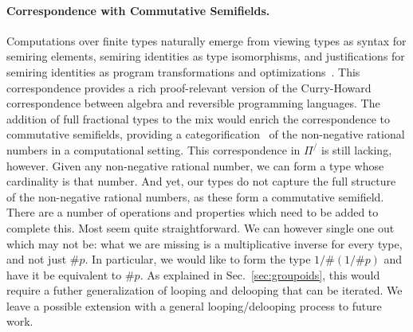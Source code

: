 \documentclass[a4paper,USenglish]{lipics-v2016-utf8x}
\newcommand{\hash}{\#}
\newcommand{\order}[1]{\hash #1}
\newcommand{\iorder}[1]{1/\hash #1}
\begin{document}
\paragraph*{Correspondence with Commutative Semifields.} Computations over
finite types naturally emerge from viewing types as syntax for semiring
elements, semiring identities as type isomorphisms, and justifications for
semiring identities as program transformations and
optimizations~\cite{Carette2016}. This correspondence provides a rich
proof-relevant version of the Curry-Howard correspondence between algebra and
reversible programming languages. The addition of full fractional types to the
mix would enrich the correspondence to commutative semifields, providing a
categorification~\cite{math/9802029} of the non-negative rational numbers in a
computational setting. This correspondence in $\Pi^/$ is still lacking,
however. Given any non-negative rational number, we can form a type whose
cardinality is that number. And yet, our types do not capture the full structure
of the non-negative rational numbers, as these form a commutative
semifield. There are a number of operations and properties which need to be
added to complete this.  Most seem quite straightforward.  We can however single
one out which may not be: what we are missing is a multiplicative inverse for
every type, and not just $\order{p}$. In particular, we would like to form the
type $\iorder{(\iorder{p})}$ and have it be equivalent to $\order{p}$.  As
explained in Sec.~\ref{sec:groupoids}, this would require a futher
generalization of looping and delooping that can be iterated. We leave a
possible extension with a general looping/delooping process to future work.



\end{document}
